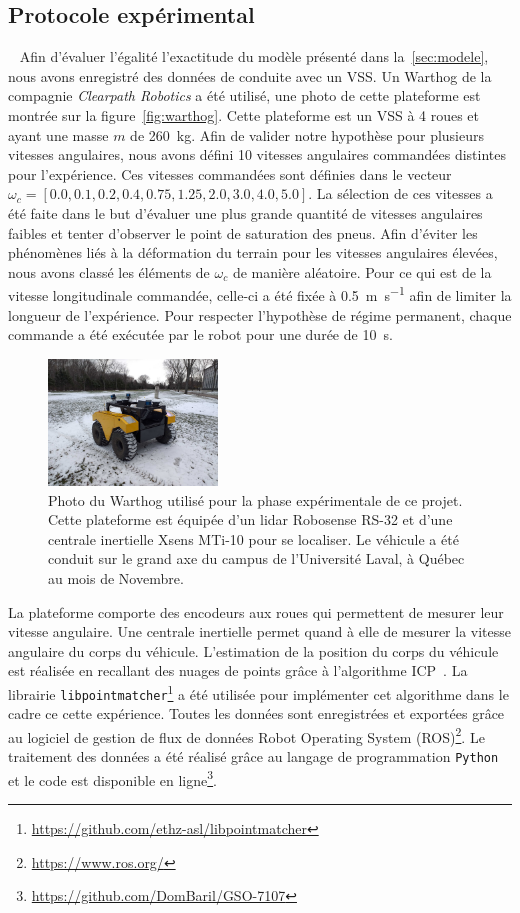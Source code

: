 \subsection{Protocole expérimental}~\label{sec:protocole}
Afin d'évaluer l'égalité l'exactitude du modèle présenté dans la~\autoref{sec:modele}, nous avons enregistré des données de conduite avec un \ac{VSS}. 
Un Warthog de la compagnie \textit{Clearpath Robotics} a été utilisé, une photo de cette plateforme est montrée sur la figure~\autoref{fig:warthog}.
Cette plateforme est un \ac{VSS} à 4 roues et ayant une masse $m$ de \SI{260}{\kg}.
Afin de valider notre hypothèse pour plusieurs vitesses angulaires, nous avons défini 10 vitesses angulaires commandées distintes pour l'expérience.
Ces vitesses commandées sont définies dans le vecteur $\omega_c = [0.0, 0.1, 0.2, 0.4, 0.75 ,1.25, 2.0, 3.0, 4.0, 5.0]$.
La sélection de ces vitesses a été faite dans le but d'évaluer une plus grande quantité de vitesses angulaires faibles et tenter d'observer le point de saturation des pneus.
Afin d'éviter les phénomènes liés à la déformation du terrain pour les vitesses angulaires élevées, nous avons classé les éléments de $\omega_c$ de manière aléatoire.
Pour ce qui est de la vitesse longitudinale commandée, celle-ci a été fixée à \SI{0.5}{\m\per\second} afin de limiter la longueur de l'expérience.
Pour respecter l'hypothèse de régime permanent, chaque commande a été exécutée par le robot pour une durée de \SI{10}{\second}.

\begin{figure}[htpb]
	\centering
	\includegraphics[width=0.4\textwidth]{figs/warthog.pdf}
	\caption{Photo du Warthog utilisé pour la phase expérimentale de ce projet.
		Cette plateforme est équipée d'un lidar Robosense RS-32 et d'une centrale inertielle Xsens MTi-10 pour se localiser.
		Le véhicule a été conduit sur le grand axe du campus de l'Université Laval, à Québec au mois de Novembre.}
	\label{fig:warthog}
\end{figure}

La plateforme comporte des encodeurs aux roues qui permettent de mesurer leur vitesse angulaire.
Une centrale inertielle permet quand à elle de mesurer la vitesse angulaire du corps du véhicule.
L'estimation de la position du corps du véhicule est réalisée en recallant des nuages de points grâce à l'algorithme \ac{ICP}~\citep{Pomerleau2015}.
La librairie \texttt{libpointmatcher}\footnote{\url{https://github.com/ethz-asl/libpointmatcher}} a été utilisée pour implémenter cet algorithme dans le cadre ce cette expérience.
Toutes les données sont enregistrées et exportées grâce au logiciel de gestion de flux de données Robot Operating System (ROS)\footnote{\url{https://www.ros.org/}}.
Le traitement des données a été réalisé grâce au langage de programmation \texttt{Python} et le code est disponible en ligne\footnote{\url{https://github.com/DomBaril/GSO-7107}}.